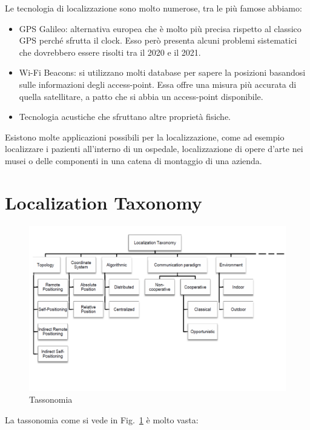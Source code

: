Le tecnologia di localizzazione sono molto numerose, tra le più famose abbiamo:
\begin{itemize}
    \item GPS Galileo: alternativa europea che è molto più precisa
        rispetto al classico GPS perché sfrutta il clock. Esso però presenta alcuni
        problemi sistematici che dovrebbero essere risolti tra il 2020 e il 2021.
    \item Wi-Fi Beacons: si utilizzano molti database per sapere la
        posizioni basandosi sulle informazioni degli access-point. Essa offre una misura
        più accurata di quella satellitare, a patto che si abbia un access-point
        disponibile.
    \item Tecnologia acustiche che sfruttano altre proprietà
        fisiche.
\end{itemize}

Esistono molte applicazioni possibili per la localizzazione, come ad
esempio localizzare i pazienti all'interno di un ospedale, localizzazione di
opere d'arte nei musei o delle componenti in una catena di montaggio di una
azienda.

\section{Localization Taxonomy}\label{subsec3.3}
\begin{figure}
    \centering
    \includegraphics[scale=0.5]{fig1-lec3pt1.png}
    \caption{Tassonomia}
    \label{fig:fig1-lec3pt1}
\end{figure}

La tassonomia come si vede in Fig.~\ref{fig:fig1-lec3pt1} è molto vasta:

